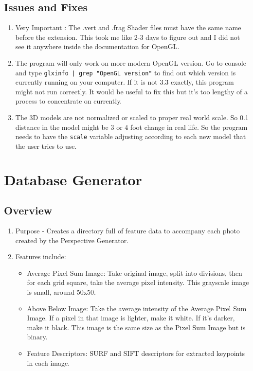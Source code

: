 \documentclass[a4paper,11pt]{article}
\begin{document}
         \subsection{Issues and Fixes}
	   \begin{enumerate}
	   \item Very Important : The .vert and .frag Shader files must have the same name before the extension. This took me like 2-3 days to figure out and I did not see it anywhere inside the documentation for OpenGL.
           \item The program will only work on more modern OpenGL version. Go to console and type \texttt{glxinfo | grep "OpenGL version"} to find out which version is currently running on your computer. If it is not 3.3 exactly, this program might not run correctly. It would be useful to fix this but it's too lengthy of a process to concentrate on currently.
           \item The 3D models are not normalized or scaled to proper real world scale. So 0.1 distance in the model might be 3 or 4 foot change in real life. So the program needs to have the \texttt{scale} variable adjusting according to each new model that the user tries to use.
         \end{enumerate}
        
        \newpage
    

        



\section{Database Generator}
  \subsection{Overview}
    \begin{enumerate}
    \item Purpose - Creates a directory full of feature data to accompany each photo created by the Perspective Generator. 
    \item Features include:
      \begin{itemize}
        \item Average Pixel Sum Image: Take original image, split into divisions, then for each grid square, take the average pixel intensity. This grayscale image is small, around 50x50.
        \item Above Below Image: Take the average intensity of the Average Pixel Sum Image. If a pixel in that image is lighter, make it white. If it's darker, make it black. This image is the same size as the Pixel Sum Image but is binary.
        \item Feature Descriptors: SURF and SIFT descriptors for extracted keypoints in each image.
      \end{itemize}
    \end{enumerate}
    
\end{document}
